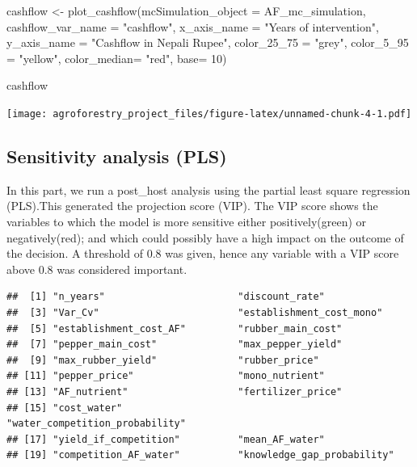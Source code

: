 \documentclass[
]{article}
\newenvironment{Shaded}{\begin{snugshade}}{\end{snugshade}}
\newcommand{\AttributeTok}[1]{\textcolor[rgb]{0.77,0.63,0.00}{#1}}
\newcommand{\DecValTok}[1]{\textcolor[rgb]{0.00,0.00,0.81}{#1}}
\newcommand{\DocumentationTok}[1]{\textcolor[rgb]{0.56,0.35,0.01}{\textbf{\textit{#1}}}}
\newcommand{\FunctionTok}[1]{\textcolor[rgb]{0.00,0.00,0.00}{#1}}
\newcommand{\NormalTok}[1]{#1}
\newcommand{\OtherTok}[1]{\textcolor[rgb]{0.56,0.35,0.01}{#1}}
\newcommand{\SpecialCharTok}[1]{\textcolor[rgb]{0.00,0.00,0.00}{#1}}
\newcommand{\StringTok}[1]{\textcolor[rgb]{0.31,0.60,0.02}{#1}}
\begin{document}
\begin{Shaded}
\begin{Highlighting}[]
\NormalTok{cashflow }\OtherTok{\textless{}{-}} \FunctionTok{plot\_cashflow}\NormalTok{(}\AttributeTok{mcSimulation\_object =}\NormalTok{ AF\_mc\_simulation,}
                          \AttributeTok{cashflow\_var\_name =} \StringTok{"cashflow"}\NormalTok{,}
                          \AttributeTok{x\_axis\_name =} \StringTok{"Years of intervention"}\NormalTok{,}
                          \AttributeTok{y\_axis\_name =} \StringTok{"Cashflow in Nepali Rupee"}\NormalTok{,}
                          \AttributeTok{color\_25\_75 =} \StringTok{"grey"}\NormalTok{,}
                          \AttributeTok{color\_5\_95 =} \StringTok{"yellow"}\NormalTok{,}
                          \AttributeTok{color\_median=} \StringTok{"red"}\NormalTok{,}
                          \AttributeTok{base=} \DecValTok{10}\NormalTok{)}

\NormalTok{cashflow}
\end{Highlighting}
\end{Shaded}

\texttt{[image: agroforestry\_project\_files/figure-latex/unnamed-chunk-4-1.pdf]}

\hypertarget{sensitivity-analysis-pls}{%
\subsection{\texorpdfstring{\textbf{Sensitivity analysis (PLS)}}{Sensitivity analysis (PLS)}}\label{sensitivity-analysis-pls}}

In this part, we run a post\_host analysis using the partial least square regression (PLS).This generated
the projection score (VIP). The VIP score shows the variables to which the model is more sensitive either positively(green) or negatively(red); and which could possibly have a high impact on the outcome of the decision.
A threshold of 0.8 was given, hence any variable with a VIP score above 0.8 was considered important.

\begin{Shaded}
\end{Shaded}

\begin{verbatim}
##  [1] "n_years"                       "discount_rate"                
##  [3] "Var_Cv"                        "establishment_cost_mono"      
##  [5] "establishment_cost_AF"         "rubber_main_cost"             
##  [7] "pepper_main_cost"              "max_pepper_yield"             
##  [9] "max_rubber_yield"              "rubber_price"                 
## [11] "pepper_price"                  "mono_nutrient"                
## [13] "AF_nutrient"                   "fertilizer_price"             
## [15] "cost_water"                    "water_competition_probability"
## [17] "yield_if_competition"          "mean_AF_water"                
## [19] "competition_AF_water"          "knowledge_gap_probability"
\end{verbatim}
\end{document}
